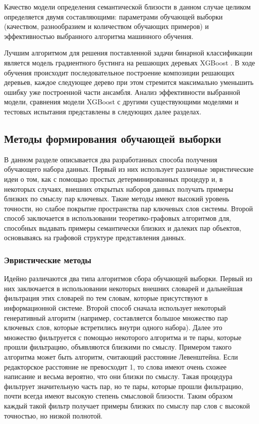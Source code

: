 Качество модели определения семантической близости в данном случае целиком определяется двумя составляющими: параметрами обучающей выборки (качеством, разнообразием и количеством обучающих примеров) и эффективностью выбранного алгоритма машинного обучения. 

Лучшим алгоритмом для решения поставленной задачи бинарной классификации является модель градиентного бустинга на решающих деревьях XGBoost \cite{xgboost}. В ходе обучения происходит последовательное построение композиции решающих деревьев, каждое следующее дерево при этом стремится максимально уменьшить ошибку уже построенной части ансамбля. Анализ эффективности выбранной модели, сравнения модели XGBoost с другими существующими моделями и тестовых испытания представлены в следующих далее разделах. 

\subsection{Методы формирования обучающей выборки}
В данном разделе описывается два разработанных способа получения обучающего набора данных. Первый из них использует различные эвристические идеи о том, как с помощью простых детерминированных процедур и, в некоторых случаях, внешних открытых наборов данных получать примеры близких по смыслу пар ключевых. Такие методы имеют высокий уровень точности, но слабое покрытие пространства пар ключевых слов системы. Второй способ заключается в использовании теоретико-графовых алгоритмов для, способных выдавать примеры семантически близких и далеких пар объектов, основываясь на графовой структуре представления данных.

\subsubsection{Эвристические методы}
Идейно различаются два типа алгоритмов сбора обучающей выборки. Первый из них заключается в использовании некоторых внешних словарей и дальнейшая фильтрация этих словарей по тем словам, которые присутствуют в информационной системе. Второй способ сначала использует некоторый генеративный алгоритм (например, составляется большое множество пар ключевых слов, которые встретились внутри одного набора). Далее это множество фильтруется с помощью некоторого алгоритма и те пары, которые прошли фильтрацию, объявляются близкими по смыслу. Примером такого алгоритма может быть алгоритм, считающий расстояние Левенштейна. Если редакторское расстояние не превосходит 1, то слова имеют очень схожее написание и  весьма вероятно, что они близки по смыслу. Такая процедура фильтрует значительную часть пар, но те пары, которые прошли фильтрацию, почти всегда  имеют высокую степень смысловой близости. Таким образом каждый такой фильтр получает примеры близких по смыслу пар слов с высокой точностью, но низкой полнотой. 

